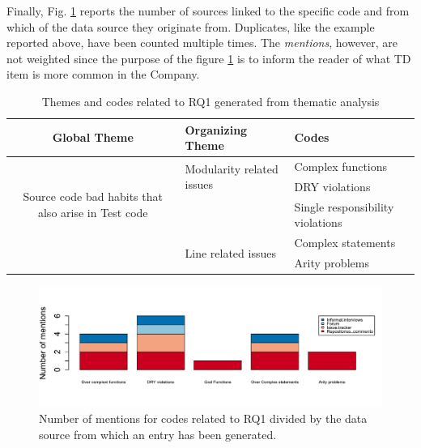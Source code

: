 Finally, Fig. \ref{fig:rq1_sources} reports the number of sources linked to the specific code and from which of the data source they originate from. Duplicates, like the example reported above, have been counted multiple times. The \textit{mentions}, however, are not weighted since the purpose of the figure \ref{fig:rq1_sources} is to inform the reader of what TD item is more common in the Company.

\begin{table}[!htbp]
\renewcommand{\arraystretch}{1.5}
\centering
\begin{tabular}{ c p{4.3cm} p{4.6cm}}

    \hline
    {\large Global Theme} & {\large Organizing Theme} & {\large Codes}\\
    \hline

    \multirow{4}{*}{\parbox[t]{4.3cm}{
        Source code bad habits that also arise in Test code}
    } & \multirow{2}{*}{\parbox[t]{4.3cm}{Modularity related issues}}
        & Complex functions \\
        & & DRY violations\\
        & & Single responsibility violations\\ \cline{2-3}

    & \multirow{2}{*}{\parbox[t]{4.6cm}{Line related issues}}
        & Complex statements \\
        & & Arity problems \\
    \hline
\end{tabular}
\caption{Themes and codes related to RQ1 generated from thematic analysis}
\label{tab:themes_rq1}
\end{table}

\begin{figure}[!htbp]
    \centering
    \includegraphics[width=\textwidth,keepaspectratio]{figure/results/rq1/sources.pdf}
    \caption[Number of mentions for codes related to RQ1]{Number of mentions for codes related to RQ1 divided by the data source from which an entry has been generated.}
    \label{fig:rq1_sources}
\end{figure}



